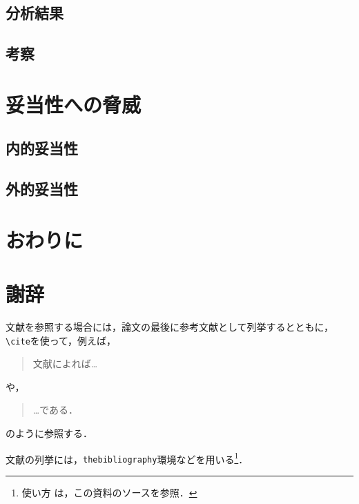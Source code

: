 \documentclass[11pt,dvipdfmx]{jreport}
\begin{document}
\section{分析結果}

\section{考察}

\chapter{妥当性への脅威}

\section{内的妥当性}

\section{外的妥当性}

\chapter{おわりに}

\chapter*{謝辞}

文献を参照する場合には，論文の最後に参考文献として列挙するとともに，
\verb|\cite|を使って，例えば，
\begin{quote}
  文献\cite{1390850475731067264}によれば…
\end{quote}
や，
\begin{quote}
  …である\cite{latex2e}．
\end{quote}
のように参照する．

文献の列挙には，{\tt thebibliography}環境などを用いる\footnote{使い方
は，この資料のソースを参照．}．




\end{document}
